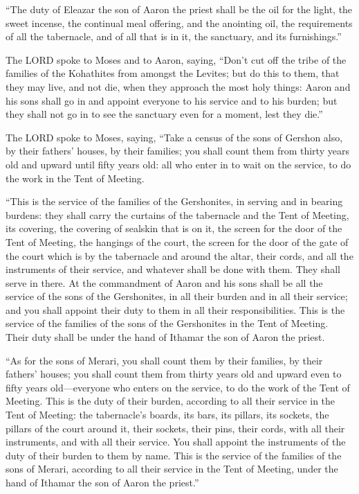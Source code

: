 ``The duty of Eleazar the son of Aaron the priest shall be
the oil for the light, the sweet incense, the continual meal offering,
and the anointing oil, the requirements of all the tabernacle, and of
all that is in it, the sanctuary, and its furnishings.''

 The LORD spoke to Moses and to Aaron, saying,
 ``Don't cut off the tribe of the families of the
Kohathites from amongst the Levites;  but do this to them,
that they may live, and not die, when they approach the most holy
things: Aaron and his sons shall go in and appoint everyone to his
service and to his burden;  but they shall not go in to see
the sanctuary even for a moment, lest they die.''

 The LORD spoke to Moses, saying,  ``Take a
census of the sons of Gershon also, by their fathers' houses, by their
families;  you shall count them from thirty years old and
upward until fifty years old: all who enter in to wait on the service,
to do the work in the Tent of Meeting.

 ``This is the service of the families of the Gershonites,
in serving and in bearing burdens:  they shall carry the
curtains of the tabernacle and the Tent of Meeting, its covering, the
covering of sealskin that is on it, the screen for the door of the Tent
of Meeting,  the hangings of the court, the screen for the
door of the gate of the court which is by the tabernacle and around the
altar, their cords, and all the instruments of their service, and
whatever shall be done with them. They shall serve in there.
 At the commandment of Aaron and his sons shall be all the
service of the sons of the Gershonites, in all their burden and in all
their service; and you shall appoint their duty to them in all their
responsibilities.  This is the service of the families of
the sons of the Gershonites in the Tent of Meeting. Their duty shall be
under the hand of Ithamar the son of Aaron the priest.

 ``As for the sons of Merari, you shall count them by their
families, by their fathers' houses;  you shall count them
from thirty years old and upward even to fifty years old---everyone who
enters on the service, to do the work of the Tent of Meeting.
 This is the duty of their burden, according to all their
service in the Tent of Meeting: the tabernacle's boards, its bars, its
pillars, its sockets,  the pillars of the court around it,
their sockets, their pins, their cords, with all their instruments, and
with all their service. You shall appoint the instruments of the duty of
their burden to them by name.  This is the service of the
families of the sons of Merari, according to all their service in the
Tent of Meeting, under the hand of Ithamar the son of Aaron the
priest.''

